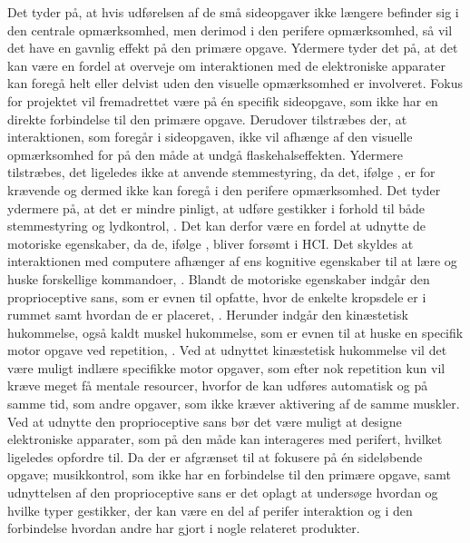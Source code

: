 Det tyder på, at hvis udførelsen af de små sideopgaver ikke længere befinder sig i den centrale opmærksomhed, men derimod i den perifere opmærksomhed, så vil det have en gavnlig effekt på den primære opgave. Ydermere tyder det på, at det kan være en fordel at overveje om interaktionen med de elektroniske apparater kan foregå helt eller delvist uden den visuelle opmærksomhed er involveret. Fokus for projektet vil fremadrettet være på én specifik sideopgave, som ikke har en direkte forbindelse til den primære opgave. Derudover tilstræbes der, at interaktionen, som foregår i sideopgaven, ikke vil afhænge af den visuelle opmærksomhed for på den måde at undgå flaskehalseffekten. Ydermere tilstræbes, det ligeledes ikke at anvende stemmestyring, da det, ifølge \textcite[s. 41]{PDF:PIEmbeddingHCIMicroManageMe}, er for krævende og dermed ikke kan foregå i den perifere opmærksomhed. Det tyder ydermere på, at det er mindre pinligt, at udføre gestikker i forhold til både stemmestyring og lydkontrol, \parencite[s. 4]{PDF:AnExploratoryStudy}. Det kan derfor være en fordel at udnytte de motoriske egenskaber, da de, ifølge \textcite[s. 187]{PDF:PIDesktopComputingKap9}, bliver forsømt i HCI. Det skyldes at interaktionen med computere afhænger af ens kognitive egenskaber til at lære og huske forskellige kommandoer, \parencite[s. 187]{PDF:PIDesktopComputingKap9}. Blandt de motoriske egenskaber indgår den proprioceptive sans, som er evnen til opfatte, hvor de enkelte kropsdele er i rummet samt hvordan de er placeret, \parencite[s. 193]{PDF:PIDesktopComputingKap9}. Herunder indgår den kinæstetisk hukommelse, også kaldt muskel hukommelse, som er evnen til at huske en specifik motor opgave ved repetition, \parencite[s. 193]{PDF:PIDesktopComputingKap9}. Ved at udnyttet kinæstetisk hukommelse vil det være muligt indlære specifikke motor opgaver, som efter nok repetition kun vil kræve meget få mentale resourcer, hvorfor de kan udføres automatisk og på samme tid, som andre opgaver, som ikke kræver aktivering af de samme muskler. Ved at udnytte den proprioceptive sans bør det være muligt at designe elektroniske apparater, som på den måde kan interageres med perifert, hvilket \textcite[s. 202]{PDF:PIDesktopComputingKap9} ligeledes opfordre til.\blankline
%
Da der er afgrænset til at fokusere på én sideløbende opgave; musikkontrol, som ikke har en forbindelse til den primære opgave, samt udnyttelsen af den proprioceptive sans er det oplagt at undersøge hvordan og hvilke typer gestikker, der kan være en del af perifer interaktion og i den forbindelse hvordan andre har gjort i nogle relateret produkter.      
 